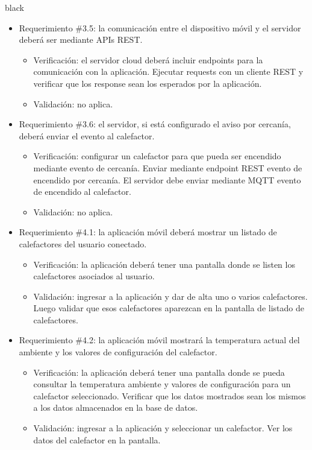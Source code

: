 \documentclass[
11pt, %
codirector, %
]{charter}
\begin{document}
\begin{consigna}{black}
\begin{itemize}
\item Requerimiento \#3.5: la comunicación entre el dispositivo móvil y el servidor deberá ser mediante APIs REST.

\begin{itemize}
	\item Verificación: el servidor cloud deberá incluir endpoints para la comunicación con la aplicación. Ejecutar requests con un cliente REST y verificar que los response sean los esperados por la aplicación.
	\item Validación: no aplica.
\end{itemize}

\item Requerimiento \#3.6: el servidor, si está configurado el aviso por cercanía, deberá enviar el evento al calefactor.

\begin{itemize}
	\item Verificación: configurar un calefactor para que pueda ser encendido mediante evento de cercanía. Enviar mediante endpoint REST evento de encendido por cercanía. El servidor debe enviar mediante MQTT evento de encendido al calefactor.
	\item Validación: no aplica.
\end{itemize}

\item Requerimiento \#4.1: la aplicación móvil deberá mostrar un listado de calefactores del usuario conectado.

\begin{itemize}
	\item Verificación: la aplicación deberá tener una pantalla donde se listen los calefactores asociados al usuario.
	\item Validación: ingresar a la aplicación y dar de alta uno o varios calefactores. Luego validar que esos calefactores aparezcan en la pantalla de listado de calefactores.
\end{itemize}

\item Requerimiento \#4.2: la aplicación móvil mostrará la temperatura actual del ambiente y los valores de configuración del calefactor.

\begin{itemize}
	\item Verificación: la aplicación deberá tener una pantalla donde se pueda consultar la temperatura ambiente y valores de configuración para un calefactor seleccionado. Verificar que los datos mostrados sean los mismos a los datos almacenados en la base de datos.
	\item Validación: ingresar a la aplicación y seleccionar un calefactor.  Ver los datos del calefactor en la pantalla.
\end{itemize}


\end{itemize}
\end{consigna}
\end{document}
